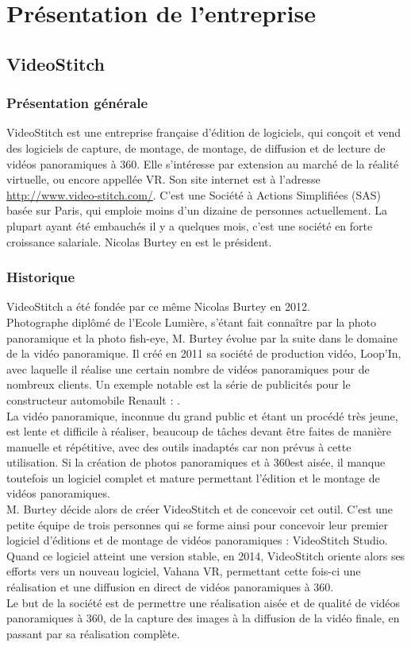 \chapter{Présentation de l'entreprise}
\section{VideoStitch}
\subsection{Présentation générale}
VideoStitch est une entreprise française d'édition de logiciels, qui conçoit et vend des logiciels de capture, de montage, de montage, de diffusion et de lecture de vidéos panoramiques à 360\degree. Elle s'intéresse par extension au marché de la réalité virtuelle, ou encore appellée VR.
Son site internet est à l'adresse \url{http://www.video-stitch.com/}.
C'est une Société à Actions Simplifiées (SAS) basée sur Paris, qui emploie moins d'un dizaine de personnes actuellement. 
La plupart ayant été embauchés il y a quelques mois, c'est une société en forte croissance salariale. 
Nicolas Burtey en est le président.

\subsection{Historique}
VideoStitch a été fondée par ce même Nicolas Burtey en 2012.\\
Photographe diplômé de l'Ecole Lumière, s'étant fait connaître par la photo panoramique et la photo fish-eye, M. Burtey évolue par la suite dans le domaine de la vidéo panoramique. 
Il créé en 2011 sa société de production vidéo, Loop'In, avec laquelle il réalise une certain nombre de vidéos panoramiques pour de nombreux clients.
Un exemple notable est la série de publicités pour le constructeur automobile Renault : \url{}.\\
La vidéo panoramique, inconnue du grand public et étant un procédé très jeune, est lente et difficile à réaliser, beaucoup de tâches devant être faites de manière manuelle et répétitive, avec des outils inadaptés car non prévus à cette utilisation.
Si la création de photos panoramiques et à 360\degree est aisée, il manque toutefois un logiciel complet et mature permettant l'édition et le montage de vidéos panoramiques.\\
M. Burtey décide alors de créer VideoStitch et de concevoir cet outil. C'est une petite équipe de trois personnes qui se forme ainsi pour concevoir leur premier logiciel d'éditions et de montage de vidéos panoramiques : VideoStitch Studio.\\
Quand ce logiciel atteint une version stable, en 2014, VideoStitch oriente alors ses efforts vers un nouveau logiciel, Vahana VR, permettant cette fois-ci une réalisation et une diffusion en direct de vidéos panoramiques à 360\degree.\\
\newline
Le but de la société est de permettre une réalisation aisée et de qualité de vidéos panoramiques à 360\degree, de la capture des images à la diffusion de la vidéo finale, en passant par sa réalisation complète.


